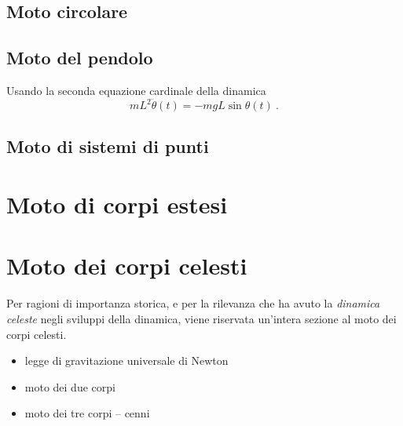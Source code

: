 \subsection{Moto circolare}

\subsection{Moto del pendolo}
Usando la seconda equazione cardinale della dinamica
\begin{equation}
    m L^2 \ddot{\theta}(t) = - m g L \sin \theta(t) \ .
\end{equation}

\subsection{Moto di sistemi di punti}

\section{Moto di corpi estesi}

\section{Moto dei corpi celesti}
Per ragioni di importanza storica, e per la rilevanza che ha avuto la \textit{dinamica celeste} negli sviluppi della dinamica, viene riservata un'intera sezione al moto dei corpi celesti.

{\color{red}
\begin{itemize}
    \item legge di gravitazione universale di Newton
    \item moto dei due corpi
    \item moto dei tre corpi -- cenni
\end{itemize}
}

